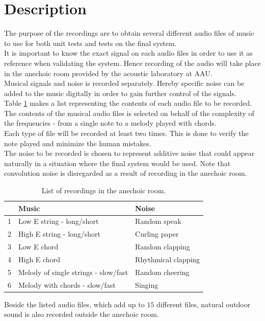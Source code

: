 \section{Description}  
The purpose of the recordings are to obtain several different audio files of music to use for both unit tests and tests on the final system. \\
It is important to know the exact signal on each audio files in order to use it as reference when validating the system. Hence recording of the audio will take place in the anechoic room provided by the acoustic laboratory at AAU. \\
Musical signals and noise is recorded separately. Hereby specific noise can be added to the music digitally in order to gain further control of the signals. \\
Table \ref{tab:audio} makes a list representing the contents of each audio file to be recorded. The contents of the musical audio files is selected on behalf of the complexity of the frequencies - from a single note to a melody played with chords.  \\
Each type of file will be recorded at least two times. This is done to verify the note played and minimize the human mistakes.    \\
The noise to be recorded is chosen to represent additive noise that could appear naturally in a situation where the final system would be used. Note that convolution noise is disregarded as a result of recording in the anechoic room.         
\begin{table}[H]
\centering
\caption{List of recordings in the anechoic room.}
\label{tab:audio}
\begin{tabular}{l|l|l}
\hline
  & \textbf{Music}                      & \textbf{Noise}     \\ \hline
1 & Low E string - long/short           & Random speak       \\ \hline
2 & High E string - long/short          & Curling paper      \\ \hline
3 & Low E chord                         & Random clapping    \\ \hline
4 & High E chord                        & Rhythmical clapping \\ \hline
5 & Melody of single strings - slow/fast & Random cheering    \\ \hline
6 & Melody with chords - slow/fast      & Singing            \\ \hline
\end{tabular}
\end{table}
Beside the listed audio files, which add up to $15$ different files, natural outdoor sound is also recorded outside the anechoic room. 

